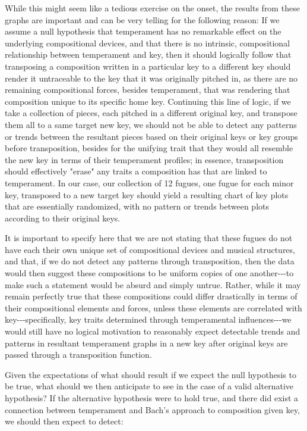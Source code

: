 While this might seem like a tedious exercise on the onset, the results
from these graphs are important and can be very telling for the
following reason: If we assume a null hypothesis that temperament has no
remarkable effect on the underlying compositional devices, and that
there is no intrinsic, compositional relationship between temperament
and key, then it should logically follow that transposing a composition
written in a particular key to a different key should render it
untraceable to the key that it was originally pitched in, as there are
no remaining compositional forces, besides temperament, that was
rendering that composition unique to its specific home key. Continuing
this line of logic, if we take a collection of pieces, each pitched in a
different original key, and transpose them all to a same target new key,
we should not be able to detect any patterns or trends between the
resultant pieces based on their original keys or key groups before
transposition, besides for the unifying trait that they would all
resemble the new key in terms of their temperament profiles; in essence,
transposition should effectively "erase" any traits a composition has
that are linked to temperament. In our case, our collection of 12
fugues, one fugue for each minor key, transposed to a new target key
should yield a resulting chart of key plots that are essentially
randomized, with no pattern or trends between plots according to their
original keys.

It is important to specify here that we are not stating that these
fugues do not have each their own unique set of compositional devices
and musical structures, and that, if we do not detect any patterns
through transposition, then the data would then suggest these
compositions to be uniform copies of one another-\/-\/-to make such a
statement would be absurd and simply untrue. Rather, while it may remain
perfectly true that these compositions could differ drastically in terms
of their compositional elements and forces, unless these elements are
correlated with key-\/-\/-specifically, key traits determined through
temperamental influences-\/-\/-we would still have no logical motivation
to reasonably expect detectable trends and patterns in resultant
temperament graphs in a new key after original keys are passed through a
transposition function.

Given the expectations of what should result if we expect the null
hypothesis to be true, what should we then anticipate to see in the case
of a valid alternative hypothesis? If the alternative hypothesis were to
hold true, and there did exist a connection between temperament and
Bach's approach to composition given key, we should then expect to
detect:

